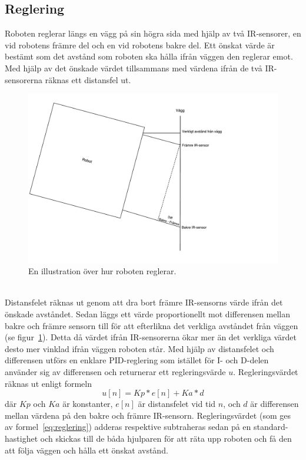 \documentclass{article}
\begin{document}
\subsection{Reglering}
\label{sec:reglering}
Roboten reglerar längs en vägg på sin högra sida med hjälp av två IR-sensorer, en vid robotens främre del och en vid robotens bakre del. Ett önskat värde är bestämt som det avstånd som roboten ska hålla ifrån väggen den reglerar emot. Med hjälp av det önskade värdet tillsammans med värdena ifrån de två IR-sensorerna räknas ett distansfel ut. 

\begin{figure}[H]
\centering
\includegraphics[scale=0.4]{Reglering}
\caption{En illustration över hur roboten reglerar.}
\label{fig:reglering}
\end{figure}
\ \\
\newline
Distansfelet räknas ut genom att dra bort främre IR-sensorns värde ifrån det önskade avståndet. Sedan läggs ett värde proportionellt mot differensen mellan bakre och främre sensorn till för att efterlikna det verkliga avståndet från väggen (se figur~\ref{fig:reglering}). Detta då värdet ifrån IR-sensorerna ökar mer än det verkliga värdet desto mer vinklad ifrån väggen roboten står.\newline\newline
Med hjälp av distansfelet och differensen utförs en enklare PID-reglering som istället för I- och D-delen använder sig av differensen och returnerar ett regleringsvärde $u$. Regleringsvärdet räknas ut enligt formeln 
\begin{equation}
u[n] = Kp * e[n] + Ka * d
\label{eq:reglering}
\end{equation}  
där $Kp$ och $Ka$ är konstanter, $e[n]$ är distansfelet vid tid $n$, och $d$ är differensen mellan värdena på den bakre och främre IR-sensorn. Regleringsvärdet (som ges av formel~\ref{eq:reglering}) adderas respektive subtraheras sedan på en standard-hastighet och skickas till de båda hjulparen för att räta upp roboten och få den att följa väggen och hålla ett önskat avstånd. 
\end{document}
